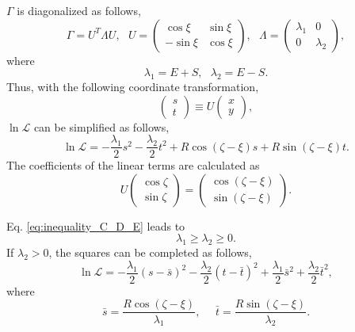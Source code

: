 \documentclass[12pt]{article}
\renewcommand{\L}{\mathcal{L}}
\begin{document}
$\Gamma$ is diagonalized as follows,
\begin{equation}
\Gamma = U^T \Lambda U,~~~U=\left(\begin{array}{cc} \cos \xi  & \sin \xi \\ - \sin \xi  & \cos \xi  \end{array}\right),~~~\Lambda = \left(\begin{array}{cc} \lambda_1 & 0 \\ 0 & \lambda_2 \end{array}\right),
\end{equation}
where
\begin{equation}
\lambda_1 = E + S,~~~\lambda_2 = E - S.
\end{equation}
Thus, with the following coordinate transformation,
\begin{equation}
\left(\begin{array}{c} s \\ t\end{array}\right) \equiv U \left(\begin{array}{c} x \\ y\end{array}\right),
\end{equation}
$\ln \L$ can be simplified as follows,
\begin{equation}
\ln \L = - \frac{\lambda_1}{2} s^2 - \frac{\lambda_2}{2} t^2 + R \cos(\zeta - \xi) s + R \sin(\zeta - \xi) t.
\end{equation}
The coefficients of the linear terms are calculated as
\begin{equation}
U \left(\begin{array}{c} \cos \zeta \\ \sin \zeta\end{array}\right) = \left(\begin{array}{c} \cos (\zeta-\xi) \\ \sin (\zeta-\xi)\end{array}\right).
\end{equation}

Eq. \eqref{eq:inequality_C_D_E} leads to
\begin{equation}
\lambda_1 \geq \lambda_2 \geq 0.
\end{equation}
If $\lambda_2 > 0$, the squares can be completed as follows,
\begin{equation}
\ln \L = - \frac{\lambda_1}{2} (s - \bar{s})^2 - \frac{\lambda_2}{2} (t - \bar{t})^2 + \frac{\lambda_1}{2} \bar{s}^2 + \frac{\lambda_2}{2} \bar{t}^2,
\end{equation}
where
\begin{equation}
\bar{s} = \frac{R \cos(\zeta - \xi)}{\lambda_1},~~~~~~\bar{t} = \frac{R \sin(\zeta - \xi)}{\lambda_2}.
\end{equation}
\end{document}
